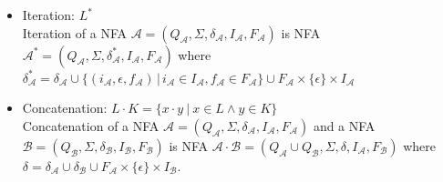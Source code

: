 \begin{itemize}
      \item Iteration: $L^{*}$\\ %
      Iteration of a NFA $\mathcal{A}=(Q_\mathcal{A},\Sigma,\delta_\mathcal{A},I_\mathcal{A},F_\mathcal{A})$ 
      is NFA $\mathcal{A}^{*}=(Q_\mathcal{A},\Sigma,\delta_\mathcal{A}^{*},I_\mathcal{A},F_\mathcal{A})$ where $\delta_\mathcal{A}^{*}=\delta_\mathcal{A}\cup
      \{(i_\mathcal{A},\epsilon,f_\mathcal{A})\,|\,i_\mathcal{A}\in I_\mathcal{A},f_\mathcal{A}\in F_\mathcal{A}\} \cup 
      F_\mathcal{A}\times \{\epsilon\} \times I_\mathcal{A}$

			\item Concatenation: $L\cdot K=\{x \cdot y\ |\ x\in L \wedge y\in K\}$\\
      Concatenation of a NFA $\mathcal{A}=(Q_\mathcal{A},\Sigma,\delta_\mathcal{A},I_\mathcal{A},F_\mathcal{A})$ and a NFA 
      $\mathcal{B}=(Q_\mathcal{B},\Sigma,\delta_\mathcal{B},I_\mathcal{B},F_\mathcal{B})$ is 
      NFA $\mathcal{A}\cdot\mathcal{B}=(Q_\mathcal{A}\cup Q_\mathcal{B},\Sigma,\delta,I_\mathcal{A},F_\mathcal{B})$ where $\delta=\delta_\mathcal{A} \cup
      \delta_\mathcal{B} \cup F_\mathcal{A}\times\{\epsilon\}\times I_\mathcal{B}$.

  \end{itemize}

